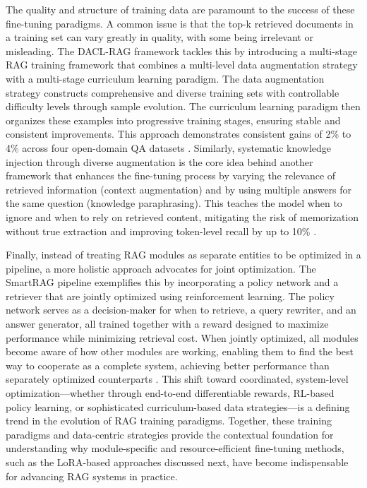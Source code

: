 \documentclass[11pt]{article}
\begin{document}
The quality and structure of training data are paramount to the success of these fine-tuning paradigms. A common issue is that the top-k retrieved documents in a training set can vary greatly in quality, with some being irrelevant or misleading. The DACL-RAG framework tackles this by introducing a multi-stage RAG training framework that combines a multi-level data augmentation strategy with a multi-stage curriculum learning paradigm. The data augmentation strategy constructs comprehensive and diverse training sets with controllable difficulty levels through sample evolution. The curriculum learning paradigm then organizes these examples into progressive training stages, ensuring stable and consistent improvements. This approach demonstrates consistent gains of 2\% to 4\% across four open-domain QA datasets \cite{ref226}. Similarly, systematic knowledge injection through diverse augmentation is the core idea behind another framework that enhances the fine-tuning process by varying the relevance of retrieved information (context augmentation) and by using multiple answers for the same question (knowledge paraphrasing). This teaches the model when to ignore and when to rely on retrieved content, mitigating the risk of memorization without true extraction and improving token-level recall by up to 10\% \cite{ref227}.

Finally, instead of treating RAG modules as separate entities to be optimized in a pipeline, a more holistic approach advocates for joint optimization. The SmartRAG pipeline exemplifies this by incorporating a policy network and a retriever that are jointly optimized using reinforcement learning. The policy network serves as a decision-maker for when to retrieve, a query rewriter, and an answer generator, all trained together with a reward designed to maximize performance while minimizing retrieval cost. When jointly optimized, all modules become aware of how other modules are working, enabling them to find the best way to cooperate as a complete system, achieving better performance than separately optimized counterparts \cite{ref228}. This shift toward coordinated, system-level optimization---whether through end-to-end differentiable rewards, RL-based policy learning, or sophisticated curriculum-based data strategies---is a defining trend in the evolution of RAG training paradigms. Together, these training paradigms and data-centric strategies provide the contextual foundation for understanding why module-specific and resource-efficient fine-tuning methods, such as the LoRA-based approaches discussed next, have become indispensable for advancing RAG systems in practice.
\end{document}
